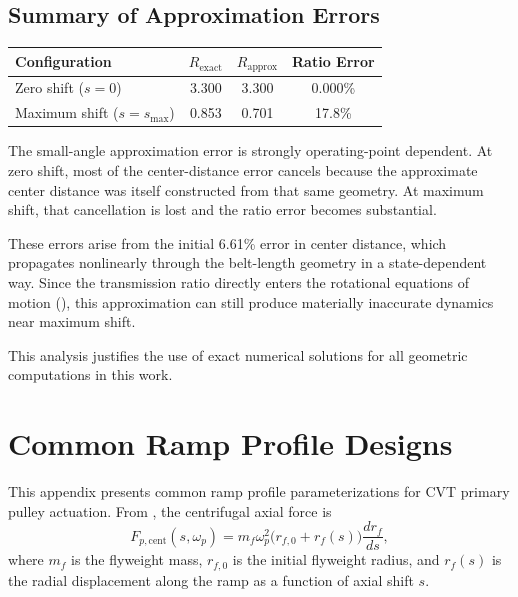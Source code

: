 \documentclass[11pt]{article}
\numberwithin{equation}{section}
\begin{document}
\subsection{Summary of Approximation Errors}

\begin{center}
\begin{tabular}{lccc}
\toprule
\textbf{Configuration} & \textbf{$R_{\mathrm{exact}}$} & \textbf{$R_{\mathrm{approx}}$} & \textbf{Ratio Error} \\
\midrule
Zero shift ($s = 0$) & 3.300 & 3.300 & 0.000\% \\
Maximum shift ($s = s_{\max}$) & 0.853 & 0.701 & 17.8\% \\
\bottomrule
\end{tabular}
\end{center}

The small-angle approximation error is strongly operating-point dependent.
At zero shift, most of the center-distance error cancels because the
approximate center distance was itself constructed from that same geometry.
At maximum shift, that cancellation is lost and the ratio error becomes
substantial.

These errors arise from the initial 6.61\% error in center distance,
which propagates nonlinearly through the belt-length geometry in a
state-dependent way. Since the transmission ratio directly enters the
rotational equations of motion (), this approximation
can still produce materially inaccurate dynamics near maximum shift.

This analysis justifies the use of exact numerical solutions for all
geometric computations in this work.

\section{Common Ramp Profile Designs}\label{sec:appendix-ramp-profiles}

This appendix presents common ramp profile parameterizations for CVT
primary pulley actuation. From , the
centrifugal axial force is
\begin{equation}
F_{p,\mathrm{cent}}(s,\omega_p)
=
m_f \omega_p^2 \bigl(r_{f,0} + r_f(s)\bigr) \frac{dr_f}{ds},
\label{eq:centrifugal_product_form}
\end{equation}
where $m_f$ is the flyweight mass, $r_{f,0}$ is the initial flyweight
radius, and $r_f(s)$ is the radial displacement along the ramp as a
function of axial shift $s$.
\end{document}
